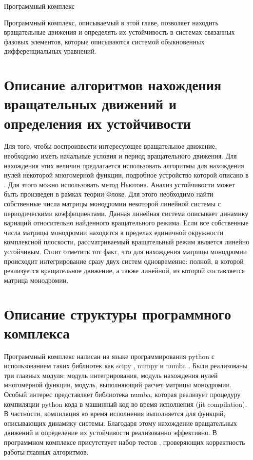 \begin{chapter}{Программный комплекс}

	Программный комплекс, описываемый в этой главе, позволяет находить вращательные движения и
	определять их устойчивость в системах связанных фазовых элементов, которые описываются системой обыкновенных
	дифференциальных уравнений.

\section{Описание алгоритмов нахождения вращательных движений и определения их устойчивости}
	Для того, чтобы воспроизвести интересующее вращательное движение, необходимо иметь
	начальные условия и период вращательного движения. Для нахождения этих величин предлагается использовать
	алгоритмы для нахождения нулей некоторой многомерной функции, подробное устройство которой описано в \cite{Khorkin}.
	Для этого можно использовать метод Ньютона.
	Анализ устойчивости может быть произведен в рамках теории Флоке. Для этого необходимо найти
	собственные числа матрицы монодромии некоторой линейной системы с периодическими коэффициентами.
	Данная линейная система описывает динамику вариаций относительно найденного вращательного режима. Если все собственные числа матрицы монодромии находятся в пределах
	единичной окружности комплексной плоскости, рассматриваемый вращательный режим является линейно устойчивым.
	Стоит отметить тот факт, что для нахождения матрицы монодромии происходит интегрирование сразу двух систем одновременно:
	полной, в которой реализуется вращательное движение, а также линейной, из которой составляется матрица монодромии.  
\section{Описание структуры программного комплекса}
Программный комплекс написан на языке программирования python с использованием таких
библиотек как scipy \cite{scipy}, numpy \cite{numpy} и numba \cite{numba}.
Были реализованы три главных модуля: модуль интегрирования, модуль нахождения нулей многомерной функции, модуль, выполняющий расчет
матрицы монодромии.
Особый интерес представляет библиотека numba, которая реализует процедуру 
компиляции python кода в машинный код во время исполнения (jit compilation).
В частности, компиляция во время исполнения выполняется для функций, описывающих динамику системы.
Благодаря этому нахождение вращательных движений и определение их устойчивости реализованно эффективно.
В программном комплексе присутствует набор тестов \cite{testing}, проверяющих корректность работы главных алгоритмов.


\end{chapter}
